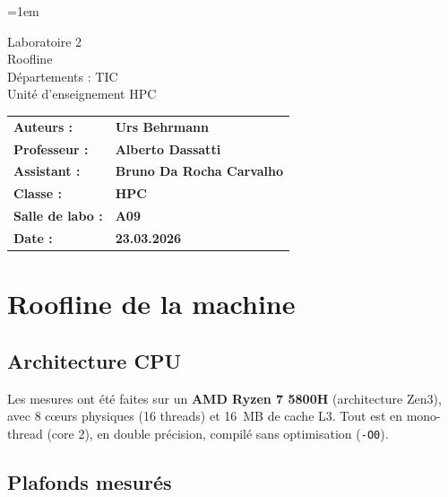 \documentclass[a4paper,12pt]{article}
\author{Urs Behrmann}
\begin{document}
\emergencystretch=1em
\thispagestyle{firstpage}

\vspace*{2cm}
\begin{center}
    \Huge Laboratoire 2 \\
    \vspace{0.2cm}
    \Large Roofline\\
    \vspace{1cm}
    \small Départements : TIC\\
    Unité d'enseignement HPC\\
\end{center}

\vspace{9cm}

\begin{flushleft}
    \begin{tabular}{@{}l l@{}}
        \textbf{Auteurs :}       & \textbf{Urs Behrmann} \\
        \textbf{Professeur :}    & \textbf{Alberto Dassatti} \\
        \textbf{Assistant :}     & \textbf{Bruno Da Rocha Carvalho} \\
        \textbf{Classe :}        & \textbf{HPC} \\
        \textbf{Salle de labo :} & \textbf{A09} \\
        \textbf{Date :}          & \textbf{23.03.2026} \\
    \end{tabular}
\end{flushleft}

\newpage
\pagestyle{otherpages}
\tableofcontents
\newpage

\section{Roofline de la machine}

\subsection{Architecture CPU}

Les mesures ont été faites sur un \textbf{AMD Ryzen 7 5800H} (architecture Zen3),
avec 8 cœurs physiques (16 threads) et 16~MB de cache L3.
Tout est en mono-thread (core 2), en double précision, compilé sans optimisation (\texttt{-O0}).

\subsection{Plafonds mesurés}
\end{document}
